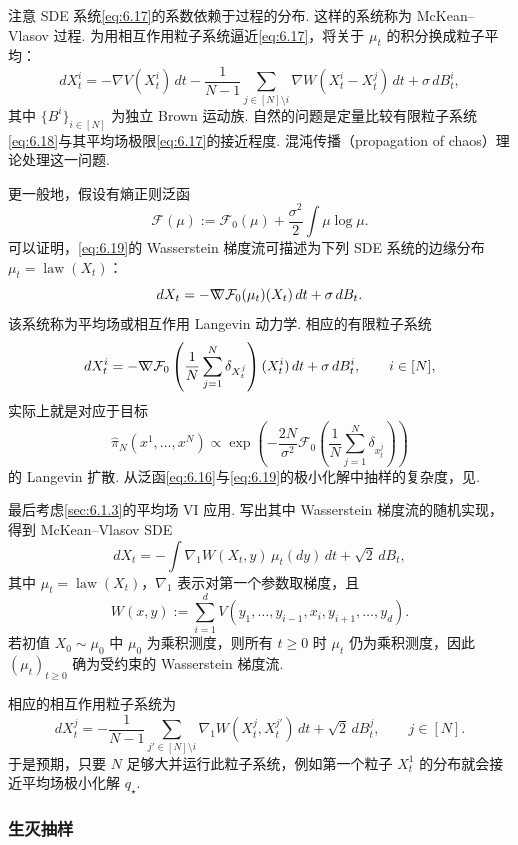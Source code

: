 注意 SDE 系统\eqref{eq:6.17}的系数依赖于过程的分布. 这样的系统称为 McKean--Vlasov 过程\cite{ref226}. 为用相互作用粒子系统逼近\eqref{eq:6.17}，将关于 $\mu_t$ 的积分换成粒子平均：
\begin{equation}\label{eq:6.18}
dX_t^i=-\nabla V(X_t^i)\,dt
-\frac1{N-1}\sum_{j\in[N]\setminus i}\nabla W(X_t^i-X_t^j)\,dt+\sigma\,dB_t^i,
\end{equation}
其中 $\{B^i\}_{i\in[N]}$ 为独立 Brown 运动族. 自然的问题是定量比较有限粒子系统\eqref{eq:6.18}与其平均场极限\eqref{eq:6.17}的接近程度. 混沌传播（propagation of chaos）理论处理这一问题\cite{ref297}.

更一般地，假设有熵正则泛函
\begin{equation}\label{eq:6.19}
\mathcal F(\mu):=\mathcal F_0(\mu)+\frac{\sigma^2}2\int\mu\log\mu.
\end{equation}
可以证明，\eqref{eq:6.19}的 Wasserstein 梯度流可描述为下列 SDE 系统的边缘分布 $\mu_t=\operatorname{law}(X_t)$：
$$
dX_t=-\nabla\mkern-10mu\nabla\mathcal F_0(\mu_t)(X_t)\,dt+\sigma\,dB_t.
$$
该系统称为平均场或相互作用 Langevin 动力学\cite{ref67,ref296}. 相应的有限粒子系统
$$
dX_t^i=-\nabla\mkern-10mu\nabla\mathcal F_0\left(\frac1N\sum_{j=1}^N\delta_{X_t^j}\right)(X_t^i)\,dt
+\sigma\,dB_t^i,\qquad i\in[N],
$$
实际上就是对应于目标
$$
\widehat\pi_N(x^1,\ldots,x^N)\propto
\exp\left(-\frac{2N}{\sigma^2}\mathcal F_0\left(\frac1N\sum_{j=1}^N\delta_{x_t^j}\right)\right)
$$
的 Langevin 扩散. 从泛函\eqref{eq:6.16}与\eqref{eq:6.19}的极小化解中抽样的复杂度，见\cite{ref185}.

最后考虑\autoref{sec:6.1.3}的平均场 VI 应用. 写出其中 Wasserstein 梯度流的随机实现，\cite{ref190}得到 McKean--Vlasov SDE
$$
dX_t=-\int\nabla_1W(X_t,y)\,\mu_t(dy)\,dt+\sqrt2\,dB_t,
$$
其中 $\mu_t=\operatorname{law}(X_t)$，$\nabla_1$ 表示对第一个参数取梯度，且
$$
W(x,y):=\sum_{i=1}^dV(y_1,\ldots,y_{i-1},x_i,y_{i+1},\ldots,y_d).
$$
若初值 $X_0\sim\mu_0$ 中 $\mu_0$ 为乘积测度，则所有 $t\geq0$ 时 $\mu_t$ 仍为乘积测度，因此 $(\mu_t)_{t\geq0}$ 确为受约束的 Wasserstein 梯度流.

相应的相互作用粒子系统为
$$
dX_t^j=-\frac1{N-1}\sum_{j'\in[N]\setminus i}\nabla_1W(X_t^j,X_t^{j'})\,dt
+\sqrt2\,dB_t^j,\qquad j\in[N].
$$
于是预期，只要 $N$ 足够大并运行此粒子系统，例如第一个粒子 $X_t^1$ 的分布就会接近平均场极小化解 $q_\star$.

\subsubsection{生灭抽样}\label{sec:6.3.2}

